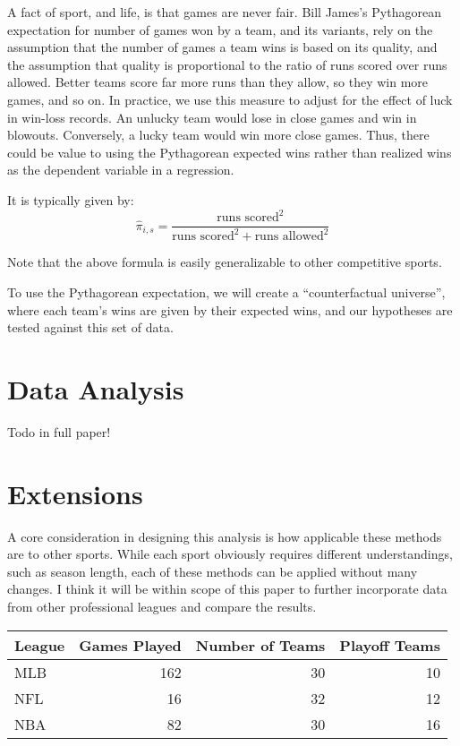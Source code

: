 \documentclass[11pt,]{article}
\begin{document}
A fact of sport, and life, is that games are never fair. Bill James's
Pythagorean expectation for number of games won by a team, and its
variants, rely on the assumption that the number of games a team wins is
based on its quality, and the assumption that quality is proportional to
the ratio of runs scored over runs allowed. Better teams score far more
runs than they allow, so they win more games, and so on. In practice, we
use this measure to adjust for the effect of luck in win-loss records.
An unlucky team would lose in close games and win in blowouts.
Conversely, a lucky team would win more close games. Thus, there could
be value to using the Pythagorean expected wins rather than realized
wins as the dependent variable in a regression.

It is typically given by:
\[\hat\pi_{i, s} = \frac{\text{runs scored}^2}{\text{runs scored}^2 + \text{runs allowed} ^2}\]

Note that the above formula is easily generalizable to other competitive
sports.

To use the Pythagorean expectation, we will create a ``counterfactual
universe'', where each team's wins are given by their expected wins, and
our hypotheses are tested against this set of data.

\section{Data Analysis}\label{data-analysis}

Todo in full paper!

\section{Extensions}\label{extensions}

A core consideration in designing this analysis is how applicable these
methods are to other sports. While each sport obviously requires
different understandings, such as season length, each of these methods
can be applied without many changes. I think it will be within scope of
this paper to further incorporate data from other professional leagues
and compare the results.

\begin{longtable}[]{@{}lrrr@{}}
\toprule
League & Games Played & Number of Teams & Playoff Teams\tabularnewline
\midrule
\endhead
MLB & 162 & 30 & 10\tabularnewline
NFL & 16 & 32 & 12\tabularnewline
NBA & 82 & 30 & 16\tabularnewline
\bottomrule
\end{longtable}
\end{document}
